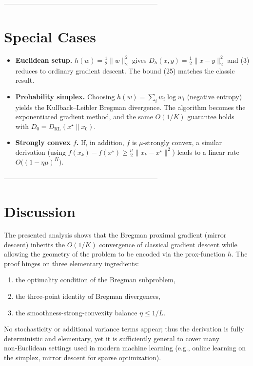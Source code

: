 \documentclass{article}
\begin{document}
--------------------------------------------------------------------

\section*{Special Cases}
\begin{itemize}
    \item \textbf{Euclidean setup.} $h(w)=\tfrac12\|w\|_{2}^{2}$ gives $D_{h}(x,y)=\tfrac12\|x-y\|_{2}^{2}$ and (3) reduces to ordinary gradient descent. The bound (25) matches the classic result.
    \item \textbf{Probability simplex.} Choosing $h(w)=\sum_{i} w_{i}\log w_{i}$ (negative entropy) yields the Kullback–Leibler Bregman divergence. The algorithm becomes the exponentiated gradient method, and the same $O(1/K)$ guarantee holds with $D_{0}=D_{\mathrm{KL}}(x^{\star}\|x_{0})$.
    \item \textbf{Strongly convex $f$.} If, in addition, $f$ is $\mu$‑strongly convex, a similar derivation (using $f(x_{k})-f(x^{\star})\ge \frac{\mu}{2}\|x_{k}-x^{\star}\|^{2}$) leads to a linear rate $O\big((1-\eta\mu)^{K}\big)$.
\end{itemize}

--------------------------------------------------------------------

\section*{Discussion}
The presented analysis shows that the Bregman proximal gradient (mirror descent) inherits the $O(1/K)$ convergence of classical gradient descent while allowing the geometry of the problem to be encoded via the prox‑function $h$. The proof hinges on three elementary ingredients:

\begin{enumerate}
    \item the optimality condition of the Bregman subproblem,
    \item the three‑point identity of Bregman divergences,
    \item the smoothness‑strong‑convexity balance $\eta\le 1/L$.
\end{enumerate}
No stochasticity or additional variance terms appear; thus the derivation is fully deterministic and elementary, yet it is sufficiently general to cover many non‑Euclidean settings used in modern machine learning (e.g., online learning on the simplex, mirror descent for sparse optimization).
\end{document}
